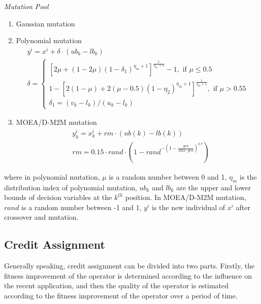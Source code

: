 \documentclass[journal]{IEEEtran}
\begin{document}
\textit{Mutation Pool}
\begin{enumerate}
  \item Gaussian mutation
  \item Polynomial mutation
        \begin{equation}
          \begin{array}{l}
            y^{i} = x^{i} + \delta \cdot (ub_k - lb_k) \\
            \delta=\left\{\begin{array}{l}
              {\left[2 \mu+(1-2 \mu)\left(1-\delta_{1}\right)^{\eta_{m}+1}\right]^{\frac{1}{\eta_{m}+1}}-1, \text { if } \mu \leq 0.5} \\
              1-\left[2(1-\mu)+2(\mu-0.5)\left(1-\eta_{2}\right)^{\eta_{m}+1}\right]^{\frac{1}{\eta_{m}+1}}, \text { if } \mu>0.55     \\
              \delta_1 = (v_k-l_k)/(u_k-l_k)
            \end{array}\right.
          \end{array}
        \end{equation}
  \item MOEA/D-M2M mutation
        \begin{align}
           & y^{i}_{k} = x^{i}_{k} + rm \cdot (ub(k)-lb(k))                                                     \\
           & r m=0.15 \cdot {rand} \cdot\left(1-{rand}^{-\left(1-\frac{gen}{Max \cdot gen}\right)^{0.7}}\right)
        \end{align}
\end{enumerate}
where in polynomial mutation, $\mu$ is a random number between 0 and 1, $\eta_m$ is the distribution index of polynomial mutation, $ub_k$ and $lb_k$ are the upper and lower bounds of decision variables at the $k^{th}$ position. In MOEA/D-M2M mutation, $rand$ is a random number between -1 and 1, $y^i$ is the new individual of $x^i$ after crossover and mutation.

\subsection{Credit Assignment \label{credit_ass}}
Generally speaking, credit assignment can be divided into two parts. Firstly, the fitness improvement of the operator is determined according to the influence on the recent application, and then the quality of the operator is estimated according to the fitness improvement of the operator over a period of time.
\end{document}
